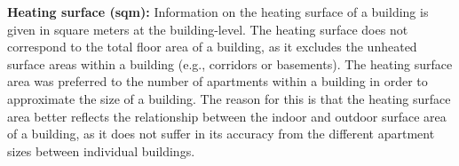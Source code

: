\documentclass[12pt,twoside]{reedthesis}
\begin{document}
\textbf{Heating surface (sqm):} Information on the heating surface of a building is given in square meters at the building-level. The heating surface does not correspond to the total floor area of a building, as it excludes the unheated surface areas within a building (e.g., corridors or basements). The heating surface area was preferred to the number of apartments within a building in order to approximate the size of a building. The reason for this is that the heating surface area better reflects the relationship between the indoor and outdoor surface area of a building, as it does not suffer in its accuracy from the different apartment sizes between individual buildings.
\begin{table}[]
\centering
\caption{Variables and data sources}
\label{tab:variables}
\end{table}
\end{document}
